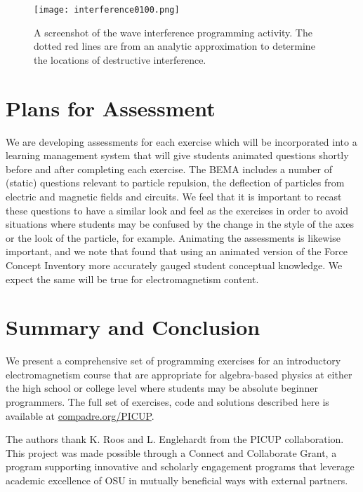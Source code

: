 \documentclass[aps,prd,10pt,twocolumn,showpacs,preprintnumbers,amsmath,amssymb,nofootinbib,floatfix]{revtex4-1}
\begin{document}
\begin{figure}
\texttt{[image: interference0100.png]}
\caption{A screenshot of the wave interference programming activity. The dotted red lines are from an analytic approximation to determine the locations of destructive interference. }\label{fig:wave}
\end{figure}

\section{Plans for Assessment}
\label{sec:assess}

We are developing assessments for each exercise which will be incorporated into a learning management system that will give students animated questions shortly before and after completing each exercise. The BEMA \cite{BEMA} includes a number of (static) questions relevant to particle repulsion, the deflection of particles from electric and magnetic fields and circuits.  We feel that it is important to recast these questions to have a similar look and feel as the exercises in order to avoid situations where students may be confused by the change in the style of the axes or the look of the particle, for example. Animating the assessments is likewise important, and we note that \cite{Dancy2006} found that using an animated version of the Force Concept Inventory more accurately gauged student conceptual knowledge. We expect the same will be true for electromagnetism content.


\section{Summary and Conclusion}

We present a comprehensive set of programming exercises for an introductory electromagnetism course that are appropriate for algebra-based physics at either the high school or college level where students may be absolute beginner programmers. The full set of exercises, code and solutions described here is available at \href{http://compadre.org/PICUP}{compadre.org/PICUP}.

\acknowledgements

The authors thank K. Roos and L. Englehardt from the PICUP collaboration. This project was made possible through a Connect and Collaborate Grant, a program supporting innovative and scholarly engagement programs that leverage academic excellence of OSU in mutually beneficial ways with external partners.


%


\end{document}
